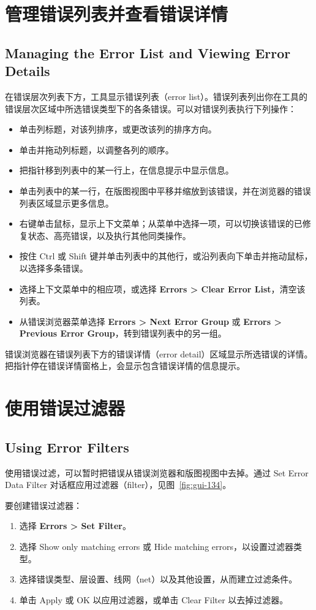 \section{管理错误列表并查看错误详情}
\subsection*{Managing the Error List and Viewing Error Details}

在错误层次列表下方，工具显示错误列表（error list）。错误列表列出你在工具的错误层次区域中所选错误类型下的各条错误。可以对错误列表执行下列操作：
\begin{itemize}
  \item 单击列标题，对该列排序，或更改该列的排序方向。
  \item 单击并拖动列标题，以调整各列的顺序。
  \item 把指针移到列表中的某一行上，在信息提示中显示信息。
  \item 单击列表中的某一行，在版图视图中平移并缩放到该错误，并在浏览器的错误列表区域显示更多信息。
  \item 右键单击鼠标，显示上下文菜单；从菜单中选择一项，可以切换该错误的已修复状态、高亮错误，以及执行其他同类操作。
  \item 按住 Ctrl 或 Shift 键并单击列表中的其他行，或沿列表向下单击并拖动鼠标，以选择多条错误。
  \item 选择上下文菜单中的相应项，或选择 \textbf{Errors > Clear Error List}，清空该列表。
  \item 从错误浏览器菜单选择 \textbf{Errors > Next Error Group} 或 \textbf{Errors > Previous Error Group}，转到错误列表中的另一组。
\end{itemize}

错误浏览器在错误列表下方的错误详情（error detail）区域显示所选错误的详情。把指针停在错误详情窗格上，会显示包含错误详情的信息提示。

\section{使用错误过滤器}
\subsection*{Using Error Filters}

使用错误过滤，可以暂时把错误从错误浏览器和版图视图中去掉。通过 Set Error Data Filter 对话框应用过滤器（filter），见图~\ref{fig:gui-134}。

要创建错误过滤器：
\begin{enumerate}
  \item 选择 \textbf{Errors > Set Filter}。
  \item 选择 Show only matching errors 或 Hide matching errors，以设置过滤器类型。
  \item 选择错误类型、层设置、线网（net）以及其他设置，从而建立过滤条件。
  \item 单击 Apply 或 OK 以应用过滤器，或单击 Clear Filter 以去掉过滤器。
\end{enumerate}

